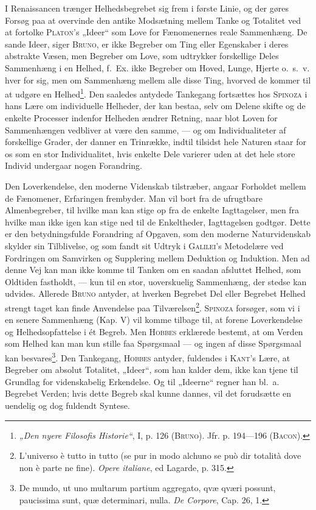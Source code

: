\documentclass[12pt]{article}
\newcommand{\opage}[1]{\marginnote{\footnotesize\textit{[#1]}}}
\begin{document}
I Renaissancen trænger Helhedsbegrebet sig frem i første Linie, og der gøres
Forsøg paa at overvinde den antike Modsætning mellem Tanke og Totalitet ved at
fortolke \textsc{Platon}'s „Ideer“ som Love for Fænomenernes reale Sammenhæng. De
sande Ideer, siger \textsc{Bruno}, er ikke Begreber om Ting eller Egenskaber i deres
abstrakte Væsen, men Begreber om Love, som udtrykker forskellige Deles
Sammenhæng i en Helhed, f.~Ex. ikke Begreber om Hoved, Lunge, Hjerte o.~s.~v. hver for
sig, men om Sammenhæng mellem alle disse Ting, hvorved de kommer til at
udgøre en Helhed\footnote{\textit{„Den nyere Filosofis Historie“}, I, p. 126
(\textsc{Bruno}). Jfr. p. 194---196 (\textsc{Bacon}).}. Den saaledes antydede
Tankegang fortsættes hos \textsc{Spinoza} i hans
Lære om individuelle Helheder, der kan bestaa, selv om Delene skifte og de
\setcounter{footnote}{0}%
\opage{21}enkelte Processer indenfor Helheden ændrer Retning, naar blot Loven for
Sammenhængen vedbliver at være den samme, --- og om Individualiteter af forskellige Grader,
der danner en Trinrække, indtil tilsidst hele Naturen staar for os som en stor
Individualitet, hvis enkelte Dele varierer uden at det hele store Individ undergaar
nogen Forandring.

Den Loverkendelse, den moderne Videnskab tilstræber, angaar Forholdet mellem
de Fænomener, Erfaringen frembyder. Man vil bort fra de ufrugtbare Almenbegreber,
til hvilke man kan stige op fra de enkelte Iagttagelser, men fra hvilke man ikke
igen kan stige ned til de Enkeltheder, Iagttagelsen godtgør. Dette er den
betydningsfulde Forandring af Opgaven, som den moderne Naturvidenskab skylder sin
Tilblivelse, og som fandt sit Udtryk i \textsc{Galilei}'s Metodelære ved Fordringen om
Samvirken og Supplering mellem Deduktion og Induktion. Men ad denne Vej kan
man ikke komme til Tanken om en saadan afsluttet Helhed, som Oldtiden
fastholdt, --- kun til en stor, uoverskuelig Sammenhæng, der stedse kan udvides.
Allerede \textsc{Bruno} antyder, at hverken Begrebet Del eller Begrebet Helhed strengt taget
kan finde Anvendelse paa Tilværelsen\footnote{L'universo è tutto in tutto (se pur
in modo alchuno se può dir totalità dove non è parte ne fine). \textit{Opere
italiane}, ed Lagarde, p. 315.}. \textsc{Spinoza} forsøger, som vi i en senere
Sammenhæng (Kap. V) vil komme tilbage til, at forene Loverkendelse og
Helhedsopfattelse i ét Begreb. Men \textsc{Hobbes} erklærede bestemt, at om Verden som Helhed kan
man kun stille faa Spørgsmaal --- og ingen af disse Spørgsmaal kan
besvares\footnote{De mundo, ut uno multarum partium aggregato, qvæ qværi
possunt, paucissima sunt, quæ determinari, nulla. \textit{De Corpore}, Cap. 26,
1.}. Den
Tankegang, \textsc{Hobbes} antyder, fuldendes i \textsc{Kant}'s Lære, at Begreber om absolut
Totalitet, „Ideer“, som han kalder dem, ikke kan tjene til Grundlag for
videnskabelig Erkendelse. Og til „Ideerne“ regner han bl.~a. Begrebet Verden; hvis
dette Begreb skal kunne dannes, vil det forudsætte en uendelig og dog fuldendt Syntese.
\end{document}
